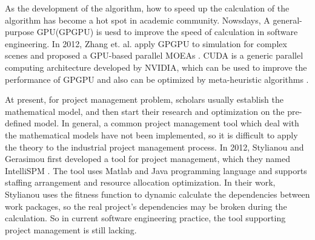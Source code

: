 As the development of the algorithm, how to speed up the calculation of the algorithm
has become a hot spot in academic community. Nowsdays,  A general-purpose GPU(GPGPU) is uesd 
to improve the speed of calculation in software engineering. In 2012, Zhang et. al.  \cite{zhang} apply GPGPU to
simulation for complex scenes and proposed a GPU-based parallel MOEAs \cite{li}.
CUDA is a generic parallel computing architecture developed by NVIDIA, which can be used to improve the performance of GPGPU \cite{langdon2} and also can be optimized by meta-heuristic algorithms \cite{langdon1}.


At present, for project management problem, scholars usually establish the
mathematical model, and then start their research and optimization on the
pre-defined model. In general, a common project management tool which deal with
the mathematical models have not been implemented, so it is difficult to apply
the theory to the industrial project management process. In 2012, Stylianou and
Gerasimou first developed a tool for project management, which they named
IntelliSPM \cite{stylianou}. The tool uses Matlab and Java programming language and 
supports staffing arrangement and resource allocation optimization. In
their work, Stylianou uses the fitness function to dynamic calculate the
dependencies between work packages, so the real project's dependencies may be
broken during the calculation. So in current software engineering practice, the
tool supporting project management is still lacking.


